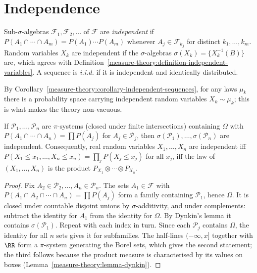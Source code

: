 \section{Independence}\label{probability:section-independence}

\begin{definition}\label{probability:definition-independent-sigma-algebras}
Sub-$\sigma$-algebras $\mathcal{F}_1, \mathcal{F}_2, \ldots$ of $\mathcal{F}$ are \emph{independent} if $P(A_1 \cap \cdots \cap A_m) = P(A_1)\cdots P(A_m)$ whenever $A_j \in \mathcal{F}_{k_j}$ for distinct $k_1, \ldots, k_m$.
Random variables $X_k$ are independent if the $\sigma$-algebras $\sigma(X_k) = \{X_k^{-1}(B)\}$ are, which agrees with Definition~\ref{measure-theory:definition-independent-variables}. A sequence is \emph{i.i.d.} if it is
independent and identically distributed.
\end{definition}

By Corollary~\ref{measure-theory:corollary-independent-sequences}, for any laws $\mu_k$ there is a probability space carrying independent random variables $X_k \sim \mu_k$; this is what makes the theory non-vacuous.

\begin{lemma}\label{probability:lemma-pi-system-independence}
If $\mathcal{P}_1, \ldots, \mathcal{P}_n$ are $\pi$-systems (closed under finite intersections) containing $\Omega$ with $P(A_1 \cap \cdots \cap A_n) = \prod P(A_j)$ for $A_j \in \mathcal{P}_j$, then $\sigma(\mathcal{P}_1), \ldots, \sigma(\mathcal{P}_n)$
are independent. Consequently, real random variables $X_1, \ldots, X_n$ are independent iff $P(X_1 \leq x_1, \ldots, X_n \leq x_n) = \prod_jP(X_j \leq x_j)$ for all $x_j$, iff the law of $(X_1, \ldots, X_n)$ is the product
$P_{X_1} \otimes \cdots \otimes P_{X_n}$.
\end{lemma}

\begin{proof}
Fix $A_2 \in \mathcal{P}_2, \ldots, A_n \in \mathcal{P}_n$. The sets $A_1 \in \mathcal{F}$ with $P(A_1 \cap A_2 \cap \cdots \cap A_n) = \prod P(A_j)$ form a family containing $\mathcal{P}_1$, hence $\Omega$. It is closed under countable disjoint unions by
$\sigma$-additivity, and under complements: subtract the identity for $A_1$ from the identity for $\Omega$. By Dynkin's lemma it contains $\sigma(\mathcal{P}_1)$. Repeat with each index in turn. Since each $\mathcal{P}_j$ contains $\Omega$, the
identity for all $n$ sets gives it for subfamilies. The half-lines $(-\infty, x]$ together with $\RR$ form a $\pi$-system generating the Borel sets, which gives the second statement; the third follows because the product
measure is characterised by its values on boxes (Lemma~\ref{measure-theory:lemma-dynkin}).
\end{proof}

